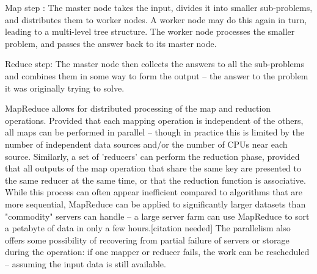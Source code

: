 \documentclass{article} %
\begin{document}
	Map step : The master node takes the input, divides it into smaller sub-problems, and distributes them to worker nodes. A worker node may do this again in turn, leading to a multi-level tree structure. The worker node processes the smaller problem, and passes the answer back to its master node.

	Reduce step: The master node then collects the answers to all the sub-problems and combines them in some way to form the output – the answer to the problem it was originally trying to solve.

	MapReduce allows for distributed processing of the map and reduction operations. Provided that each mapping operation is independent of the others, all maps can be performed in parallel – though in practice this is limited by the number of independent data sources and/or the number of CPUs near each source. Similarly, a set of 'reducers' can perform the reduction phase, provided that all outputs of the map operation that share the same key are presented to the same reducer at the same time, or that the reduction function is associative. While this process can often appear inefficient compared to algorithms that are more sequential, MapReduce can be applied to significantly larger datasets than "commodity" servers can handle – a large server farm can use MapReduce to sort a petabyte of data in only a few hours.[citation needed] The parallelism also offers some possibility of recovering from partial failure of servers or storage during the operation: if one mapper or reducer fails, the work can be rescheduled – assuming the input data is still available.
\end{document}
